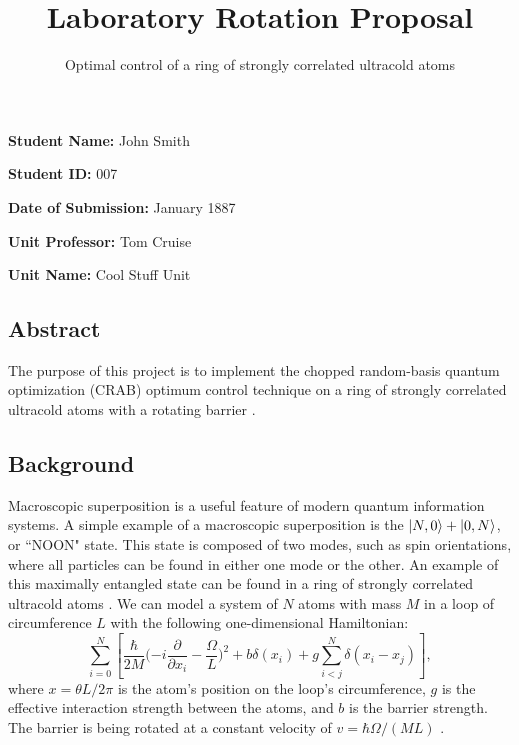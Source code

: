 \documentclass[fontsize=10pt, twocolumn]{scrartcl}	 %
\title{\vspace{-2.8cm}  \color{DarkRed} Laboratory Rotation Proposal} %
\subtitle{Optimal control of a ring of strongly correlated ultracold atoms \vspace{-2cm} }
\date{} %
\begin{document}
\maketitle %
\thispagestyle{fancy} %

 \textbf{Student Name:}  John Smith
 
 \textbf{Student ID:} 007
 
\textbf{Date of Submission:} January 1887

\textbf{Unit Professor:} Tom Cruise 

\textbf{Unit Name:} Cool Stuff Unit

\subsection*{Abstract}
The purpose of this project is to implement the chopped random-basis quantum optimization (CRAB) optimum control technique \cite{CRAB} on a ring of strongly correlated ultracold atoms with a rotating barrier \cite{RING}.


\subsection*{Background}
Macroscopic superposition is a useful feature of modern quantum information systems. A simple example of a macroscopic superposition is the $\ket{N,0} + \ket{0,N}$, or ``NOON" state. This state is composed of two modes, such as spin orientations, where all particles can be found in either one mode or the other. An example of this maximally entangled state can be found in a ring of strongly correlated ultracold atoms \cite{RING}. We can model a system of $N$ atoms with mass $M$ in a loop of circumference $L$ with the following one-dimensional Hamiltonian\cite{RING}:
$$\sum_{i=0} ^{N} [{\frac{\hbar}{2M}(-i\frac{\partial}{\partial x_i}-\frac{\Omega}{L}})^2 + b\delta(x_i) +g \sum_{i<j} ^{N} \delta (x_i - x_j )],$$
where $x = \theta L / 2 \pi$ is the atom's position on the loop's circumference, $g$ is the effective interaction strength between the atoms, and $b$ is the barrier strength. The barrier is being rotated at a constant velocity of $v = \hbar \Omega/(ML)$ \cite{RING}. 
\end{document}
